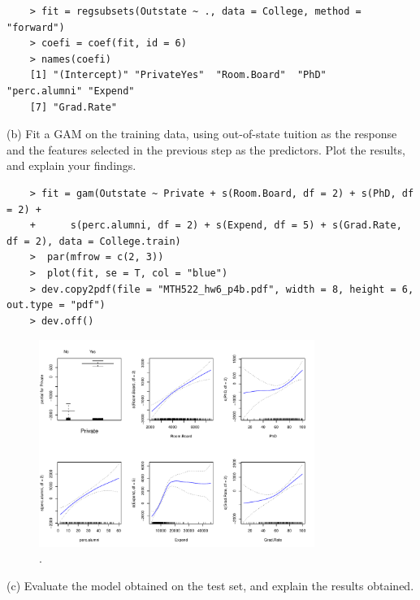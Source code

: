 \documentclass{article}
\begin{document}
\begin{program}
	\begin{verbatim}
	> fit = regsubsets(Outstate ~ ., data = College, method = "forward")
	> coefi = coef(fit, id = 6)
	> names(coefi)
	[1] "(Intercept)" "PrivateYes"  "Room.Board"  "PhD"         "perc.alumni" "Expend"     
	[7] "Grad.Rate"  
	\end{verbatim}
\end{program}


\newpage


(b) Fit a GAM on the training data, using out-of-state tuition as the response and the features selected in the previous step as the predictors. Plot the results, and explain your findings.\\

\begin{program}
	\begin{verbatim}
	> fit = gam(Outstate ~ Private + s(Room.Board, df = 2) + s(PhD, df = 2) +
	+      s(perc.alumni, df = 2) + s(Expend, df = 5) + s(Grad.Rate, df = 2), data = College.train)
	>  par(mfrow = c(2, 3))
	>  plot(fit, se = T, col = "blue")
	> dev.copy2pdf(file = "MTH522_hw6_p4b.pdf", width = 8, height = 6, out.type = "pdf")
	> dev.off()
	\end{verbatim}
\end{program}


\begin{figure}[htb]
	\begin{center}
		\includegraphics[width=0.8\textwidth]{MTH522_hw6_p4b.pdf}
	\end{center}
	\caption{.}
	\label{fig:MTH522_hw6_p4b}
\end{figure}

\newpage


(c) Evaluate the model obtained on the test set, and explain the results obtained.\\
\end{document}
